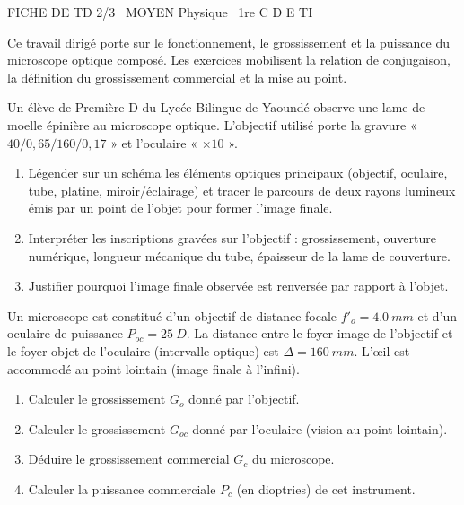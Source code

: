 \documentclass[11pt]{article}
\begin{document}
\begin{tcolorbox}[enhanced,colback=popink,colframe=popink,arc=10pt,boxrule=0pt,left=12pt,right=12pt,top=9pt,bottom=9pt]
{\color{white}\popxbold\small FICHE DE TD 2/3 \textbullet\ MOYEN \hfill Physique \textbullet\ 1re C D E TI\par}
\end{tcolorbox}
\vspace{4pt}
\noindent Ce travail dirigé porte sur le fonctionnement, le grossissement et la puissance du microscope optique composé. Les exercices mobilisent la relation de conjugaison, la définition du grossissement commercial et la mise au point.

\begin{exercice}
Un élève de Première D du Lycée Bilingue de Yaoundé observe une lame de moelle épinière au microscope optique. L'objectif utilisé porte la gravure « $40/0,65/160/0,17$ » et l'oculaire « $\times 10$ ».
\begin{enumerate}
    \item Légender sur un schéma les éléments optiques principaux (objectif, oculaire, tube, platine, miroir/éclairage) et tracer le parcours de deux rayons lumineux émis par un point de l'objet pour former l'image finale.
    \item Interpréter les inscriptions gravées sur l'objectif : grossissement, ouverture numérique, longueur mécanique du tube, épaisseur de la lame de couverture.
    \item Justifier pourquoi l'image finale observée est renversée par rapport à l'objet.
\end{enumerate}
\end{exercice}

\begin{exercice}
Un microscope est constitué d'un objectif de distance focale $f'_o = \SI{4,0}{mm}$ et d'un oculaire de puissance $P_{oc} = \SI{25}{D}$. La distance entre le foyer image de l'objectif et le foyer objet de l'oculaire (intervalle optique) est $\Delta = \SI{160}{mm}$. L'œil est accommodé au point lointain (image finale à l'infini).
\begin{enumerate}
    \item Calculer le grossissement $G_o$ donné par l'objectif.
    \item Calculer le grossissement $G_{oc}$ donné par l'oculaire (vision au point lointain).
    \item Déduire le grossissement commercial $G_c$ du microscope.
    \item Calculer la puissance commerciale $P_c$ (en dioptries) de cet instrument.
\end{enumerate}
\end{exercice}
\end{document}
